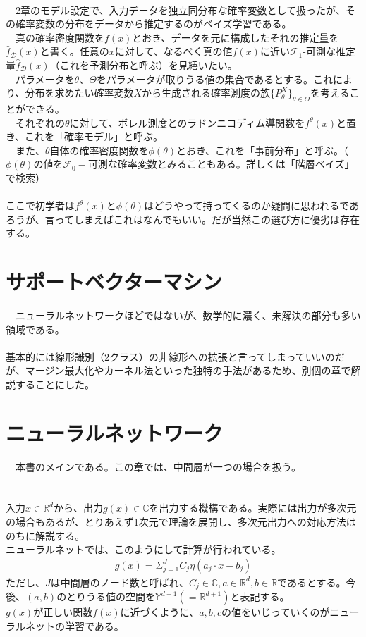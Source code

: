 \documentclass{jsarticle}
\begin{document}
\scalebox{1.1}{1.ベイズ学習とは}\\
　2章のモデル設定で、入力データを独立同分布な確率変数として扱ったが、その確率変数の分布をデータから推定するのがベイズ学習である。\\
　真の確率密度関数を$f(x)$とおき、データを元に構成したそれの推定量を$\hat{f}_\mathcal{D}(x)$と書く。任意の$x$に対して、なるべく真の値$f(x)$に近い$\mathcal{F}_1$-可測な推定量$\hat{f}_\mathcal{D}(x)$（これを予測分布と呼ぶ）を見繕いたい。\\
　パラメータを$\theta$、$\Theta$をパラメータが取りうる値の集合であるとする。これにより、分布を求めたい確率変数$X$から生成される確率測度の族$\{P^X_\theta\}_{\theta\in\Theta}$を考えることができる。\\
　それぞれの$\theta$に対して、ボレル測度とのラドンニコディム導関数を$f^\theta(x)$と置き、これを「確率モデル」と呼ぶ。\\
　また、$\theta$自体の確率密度関数を$\phi(\theta)$とおき、これを「事前分布」と呼ぶ。（$\phi(\theta)$の値を$\mathcal{F}_0-$可測な確率変数とみることもある。詳しくは「階層ベイズ」で検索）\\
　\\
ここで初学者は$f^\theta(x)$と$\phi(\theta)$はどうやって持ってくるのか疑問に思われるであろうが、言ってしまえばこれはなんでもいい。だが当然この選び方に優劣は存在する。
　
　

\newpage
\section{サポートベクターマシン}
　ニューラルネットワークほどではないが、数学的に濃く、未解決の部分も多い領域である。\\
\scalebox{1.1}{1.サポートベクターマシンとは}\\
基本的には線形識別（2クラス）の非線形への拡張と言ってしまっていいのだが、マージン最大化やカーネル法といった独特の手法があるため、別個の章で解説することにした。
　

\newpage
\section{ニューラルネットワーク}
　本書のメインである。この章では、中間層が一つの場合を扱う。\\
　\\
\scalebox{1.1}{1.ニューラルネットワークとは}\\
入力$x\in\mathbb{R}^d$から、出力$g(x)\in\mathbb{C}$を出力する機構である。実際には出力が多次元の場合もあるが、とりあえず1次元で理論を展開し、多次元出力への対応方法はのちに解説する。\\
ニューラルネットでは、このようにして計算が行われている。
\begin{eqnarray}
g(x)=\Sigma_{j=1}^JC_j\eta(a_j\cdot x-b_j)
\end{eqnarray}
ただし、$J$は中間層のノード数と呼ばれ、$C_j\in\mathbb{C},a\in\mathbb{R}^d,b\in\mathbb{R}$であるとする。今後、$(a,b)$のとりうる値の空間を$\mathbb{Y}^{d+1}(=\mathbb{R}^{d+1})$と表記する。\\
$g(x)$が正しい関数$f(x)$に近づくように、$a,b,c$の値をいじっていくのがニューラルネットの学習である。\\
\end{document}
